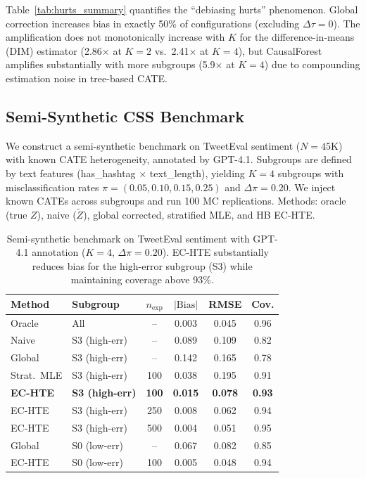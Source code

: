 \documentclass[11pt,twocolumn]{article}
\begin{document}
Table~\ref{tab:hurts_summary} quantifies the ``debiasing hurts'' phenomenon. Global correction increases bias in exactly 50\% of configurations (excluding $\Delta\tau = 0$). The amplification does not monotonically increase with $K$ for the difference-in-means (DIM) estimator (2.86$\times$ at $K\!=\!2$ vs.\ 2.41$\times$ at $K\!=\!4$), but CausalForest amplifies substantially with more subgroups (5.9$\times$ at $K\!=\!4$) due to compounding estimation noise in tree-based CATE.

\subsection{Semi-Synthetic CSS Benchmark}
\label{sec:semi_synth}

We construct a semi-synthetic benchmark on TweetEval sentiment ($N\!=\!45\text{K}$) with known CATE heterogeneity, annotated by GPT-4.1. Subgroups are defined by text features (has\_hashtag $\times$ text\_length), yielding $K\!=\!4$ subgroups with misclassification rates $\pi = (0.05, 0.10, 0.15, 0.25)$ and $\Delta\pi = 0.20$. We inject known CATEs across subgroups and run 100 MC replications. Methods: oracle (true $Z$), naive ($\tilde{Z}$), global corrected, stratified MLE, and HB EC-HTE.

\begin{table}[t]
\centering
\caption{Semi-synthetic benchmark on TweetEval sentiment with GPT-4.1 annotation ($K\!=\!4$, $\Delta\pi = 0.20$). EC-HTE substantially reduces bias for the high-error subgroup (S3) while maintaining coverage above 93\%.}
\label{tab:semi_synth}
\small
\begin{tabular}{@{}llcccc@{}}
\toprule
Method & Subgroup & $n_{\text{exp}}$ & $|\text{Bias}|$ & RMSE & Cov. \\
\midrule
Oracle & All & -- & 0.003 & 0.045 & 0.96 \\
Naive & S3 (high-err) & -- & 0.089 & 0.109 & 0.82 \\
Global & S3 (high-err) & -- & 0.142 & 0.165 & 0.78 \\
Strat.\ MLE & S3 (high-err) & 100 & 0.038 & 0.195 & 0.91 \\
\textbf{EC-HTE} & \textbf{S3 (high-err)} & \textbf{100} & \textbf{0.015} & \textbf{0.078} & \textbf{0.93} \\
EC-HTE & S3 (high-err) & 250 & 0.008 & 0.062 & 0.94 \\
EC-HTE & S3 (high-err) & 500 & 0.004 & 0.051 & 0.95 \\
Global & S0 (low-err) & -- & 0.067 & 0.082 & 0.85 \\
EC-HTE & S0 (low-err) & 100 & 0.005 & 0.048 & 0.94 \\
\bottomrule
\end{tabular}
\end{table}
\end{document}

